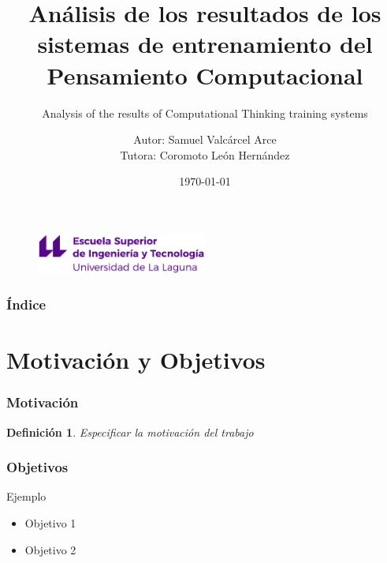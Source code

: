 \documentclass{beamer}
\title[Defensa Oral TFG]{Análisis de los resultados de los sistemas de entrenamiento del Pensamiento Computacional}
\subtitle{Analysis of the results of Computational Thinking training systems}
\author[Samuel Valcárcel Arce]{Autor: Samuel Valcárcel Arce \\ Tutora: Coromoto León Hernández}
\institute[ULL]{Universidad de La Laguna}
\date[\today]{\today}
\newtheorem{definicion}{Definición}
\begin{document}
  
\begin{frame}
  \begin{figure}
  \includegraphics[width=0.5\textwidth]{img/logo_nuevo.eps}
  \end{figure}
  \hspace*{7.5cm}
  \titlepage

\end{frame}

\begin{frame}
  \frametitle{Índice}  
  \tableofcontents[pausesections]
\end{frame}


\section{Motivación y Objetivos}


\begin{frame}

\frametitle{Motivación}

\begin{definicion}
Especificar la motivación del trabajo
\end{definicion}

\end{frame}

\begin{frame}

\frametitle{Objetivos }

\begin{block}{Ejemplo}
  \begin{itemize}
  \item
   Objetivo 1 
  \pause

  \item
   Objetivo 2

  \end{itemize}
\end{block}

\end{frame}
\end{document}
